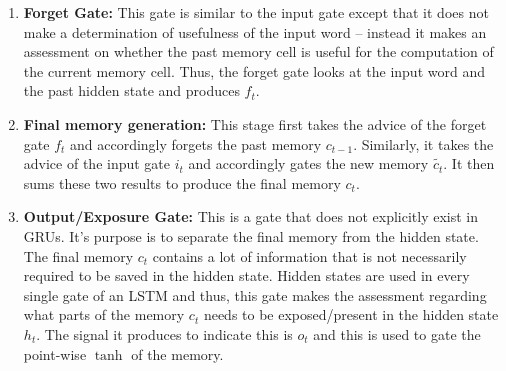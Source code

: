 \documentclass{article}
\begin{document}
\begin{appendices}
\begin{enumerate}
		\item \textbf{Forget Gate:} This gate is similar to the input gate except that it does not make a determination of usefulness of the input word – instead it makes an assessment on whether the past memory cell is useful for the computation of the current memory cell. Thus, the forget gate looks at the input word and the past hidden state and produces \(f_t\).
		
		\item \textbf{Final memory generation:} This stage first takes the advice of the forget gate \(f_t\) and accordingly forgets the past memory \(c_{t-1}\). Similarly, it takes the advice of the input gate \(i_t\) and accordingly gates the new memory \(\widetilde{c_t}\). It then sums these two results to produce the final memory \(c_t\).
		
		\item \textbf{Output/Exposure Gate:} This is a gate that does not explicitly exist in GRUs. It’s purpose is to separate the final memory from the hidden state. The final memory \(c_t\) contains a lot of information that is not necessarily required to be saved in the hidden state. Hidden states are used in every single gate of an LSTM and thus, this gate makes the assessment regarding what parts of the memory \(c_t\) needs to be exposed/present in the hidden state \(h_t\). The signal it produces to indicate this is \(o_t\) and this is used to gate the point-wise \(\tanh\) of the memory.
		
	\end{enumerate}


\end{appendices}
\end{document}

